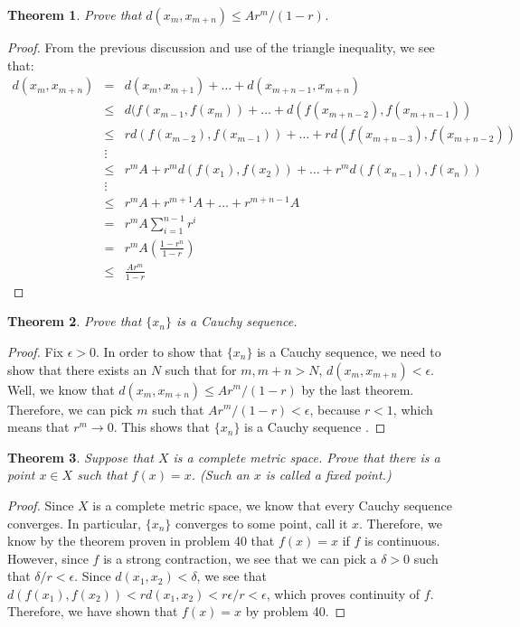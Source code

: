 \documentclass[psamsfonts]{amsart}
\newtheorem{thm}{Theorem}[section]
\theoremstyle{definition}
\theoremstyle{remark}
\numberwithin{equation}{section}
\begin{document}
\begin{thm}
Prove that $d(x_m, x_{m+n}) \leq A r^m/(1-r)$. 
\end{thm}

\begin{proof}
From the previous discussion and use of the triangle inequality, we see that:
\begin{eqnarray}
d(x_m, x_{m+n} ) &=& d(x_m, x_{m+1}) + \ldots + d(x_{m+n-1}, x_{m+n}) \\
&\leq& d(f(x_{m-1},f(x_{m})) + \ldots + d(f(x_{m+n-2}),f(x_{m+n-1})) \\
&\leq& r d(f(x_{m-2}),f(x_{m-1})) + \ldots + r d(f(x_{m+n-3}), f(x_{m+n-2})) \\
&\vdots& \\
&\leq & r^m A + r^m d(f(x_1), f(x_2)) + \ldots + r^m d(f(x_{n-1}),f(x_n)) \\
&\vdots& \\
&\leq& r^m A + r^{m+1} A + \ldots + r^{m+n-1} A \\
&=& r^m A \sum_{i=1}^{n-1} r^i \\
&=& r^m A \left( \frac{1 - r^n}{1-r} \right) \\
&\leq& \frac{A r^m}{1-r}
\end{eqnarray}
\end{proof}

\begin{thm}
Prove that $\{ x_n \}$ is a Cauchy sequence. 
\end{thm}

\begin{proof}
Fix $\epsilon > 0$. In order to show that $\{ x_n \}$ is a Cauchy sequence, we need to show that there exists an $N$ such that for $m,m+n > N$, $d(x_{m},x_{m+n}) < \epsilon$. Well, we know that $d(x_m, x_{m+n}) \leq A r^m/(1-r)$ by the last theorem. Therefore, we can pick $m$ such that $A r^m / (1-r) < \epsilon$, because $r <1$, which means that $r^m \to 0$. This shows that $\{ x_n \}$ is a Cauchy sequence .
\end{proof}

\begin{thm}
Suppose that $X$ is a complete metric space. Prove that there is a point $x \in X$ such that $f(x) = x$. (Such an $x$ is called a fixed point.) 
\end{thm}

\begin{proof}
Since $X$ is a complete metric space, we know that every Cauchy sequence converges. In particular, $\{ x_n \}$ converges to some point, call it $x$. Therefore, we know by the theorem proven in problem 40 that $f(x) = x$ if $f$ is continuous. However, since $f$ is a strong contraction, we see that we can pick a $\delta>0$ such that $\delta/r < \epsilon$. Since $d(x_1,x_2) < \delta$, we see that $d(f(x_1),f(x_2)) < r d(x_1,x_2) < r \epsilon/ r < \epsilon$, which proves continuity of $f$. Therefore, we have shown that $f(x) = x$ by problem 40. 
\end{proof}
\end{document}
